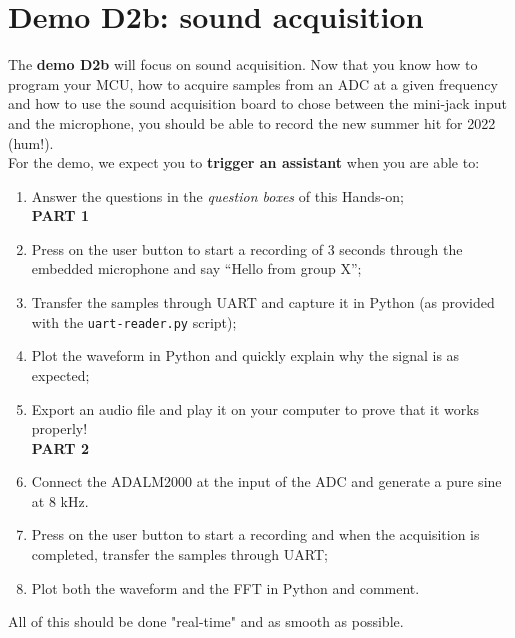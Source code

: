 \clearpage
\section{Demo D2b: sound acquisition}

The \textbf{demo D2b} will focus on sound acquisition. Now that you know how to program your MCU, how to acquire samples from an ADC at a given frequency and how to use the sound acquisition board to chose between the mini-jack input and the microphone, you should be able to record the new summer hit for 2022 (hum!). \\

\noindent For the demo, we expect you to \textbf{trigger an assistant} when you are able to:

\begin{enumerate}
    \item Answer the questions in the \textit{question boxes} \bcquestion of this Hands-on; \\

    \textbf{PART 1}
    \item Press on the user button to start a recording of 3 seconds through the embedded microphone and say “Hello from group X”;
    \item Transfer the samples through UART and capture it in Python (as provided with the \texttt{uart-reader.py} script);
    \item Plot the waveform in Python and quickly explain why the signal is as expected;
    \item Export an audio file and play it on your computer to prove that it works properly! \\

    \textbf{PART 2}
    \item Connect the ADALM2000 at the input of the ADC and generate a pure sine at 8 kHz.
    \item Press on the user button to start a recording and when the acquisition is completed, transfer the samples through UART;
    \item Plot both the waveform and the FFT in Python and comment.
\end{enumerate}

\vspace{0.3cm}
\noindent All of this should be done "real-time" and as smooth as possible.

